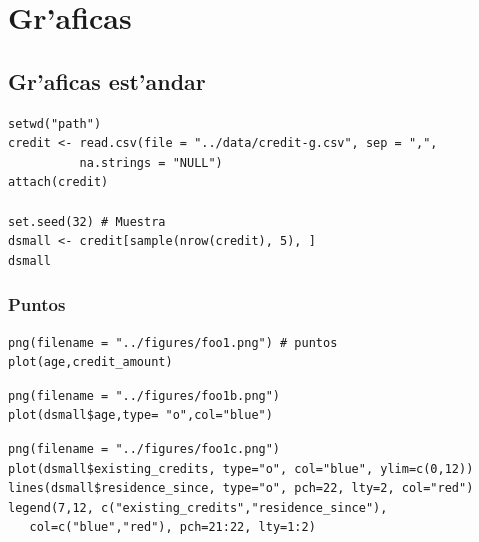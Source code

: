 \chapter{Gr'aficas}

\section{Gr'aficas est'andar}

\begin{verbatim}
setwd("path")
credit <- read.csv(file = "../data/credit-g.csv", sep = ",", 
          na.strings = "NULL")
attach(credit)

set.seed(32) # Muestra
dsmall <- credit[sample(nrow(credit), 5), ]
dsmall
\end{verbatim}

\subsection{Puntos}

\begin{verbatim}
png(filename = "../figures/foo1.png") # puntos
plot(age,credit_amount)
\end{verbatim}

\begin{verbatim}
png(filename = "../figures/foo1b.png")
plot(dsmall$age,type= "o",col="blue")
\end{verbatim}

\begin{verbatim}
png(filename = "../figures/foo1c.png")
plot(dsmall$existing_credits, type="o", col="blue", ylim=c(0,12))
lines(dsmall$residence_since, type="o", pch=22, lty=2, col="red")
legend(7,12, c("existing_credits","residence_since"), 
   col=c("blue","red"), pch=21:22, lty=1:2)
\end{verbatim}

